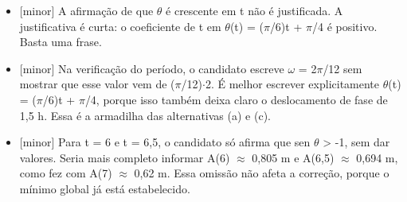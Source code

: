 \documentclass{article}%
\begin{document}
\begin{itemize}%
\item%
{[}minor{]} A afirmação de que $\theta$ é crescente em t não é justificada. A justificativa é curta: o coeficiente de t em $\theta$(t) = ($\pi$/6)t + $\pi$/4 é positivo. Basta uma frase.%
\item%
{[}minor{]} Na verificação do período, o candidato escreve $\omega$ = 2$\pi$/12 sem mostrar que esse valor vem de ($\pi$/12)$\cdot$2. É melhor escrever explicitamente $\theta$(t) = ($\pi$/6)t + $\pi$/4, porque isso também deixa claro o deslocamento de fase de 1,5 h. Essa é a armadilha das alternativas (a) e (c).%
\item%
{[}minor{]} Para t = 6 e t = 6,5, o candidato só afirma que sen $\theta$ > -1, sem dar valores. Seria mais completo informar A(6) $\approx$ 0,805 m e A(6,5) $\approx$ 0,694 m, como fez com A(7) $\approx$ 0,62 m. Essa omissão não afeta a correção, porque o mínimo global já está estabelecido.%
\end{itemize}%
\end{document}
